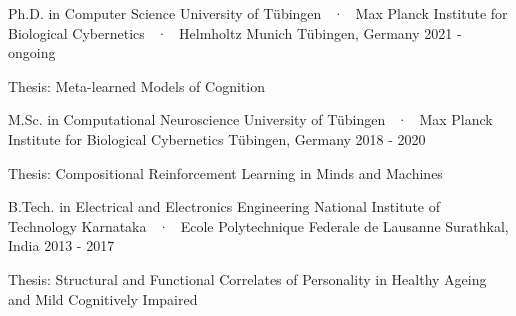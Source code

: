 \begin{cventries}
\vspace{5mm}
  \cventryEd
    {Ph.D. in Computer Science} %
    {University of Tübingen ~·~ Max Planck Institute for Biological Cybernetics  ~·~ Helmholtz Munich} %
    {}
    {Tübingen, Germany} %
    {2021 - ongoing} %
  {\begin{cvitems} \item Thesis: Meta-learned Models of Cognition %
  \end{cvitems}}

  \cventryEd
    {M.Sc. in Computational Neuroscience} %
    {University of Tübingen ~·~ Max Planck Institute for Biological Cybernetics} %
    {}
    {Tübingen, Germany} %
    {2018 - 2020} %
  {\begin{cvitems} \item Thesis: Compositional Reinforcement Learning in Minds and Machines %
  \end{cvitems}}


  \cventryEd
    {B.Tech.  in Electrical and Electronics Engineering} %
    {National Institute of Technology Karnataka ~·~ Ecole Polytechnique Federale de Lausanne} %
    {}
    {Surathkal, India} %
    {2013 - 2017} %
    {\begin{cvitems}\item Thesis: Structural and Functional Correlates of Personality in Healthy Ageing and Mild Cognitively Impaired
    \end{cvitems}}

\end{cventries}
